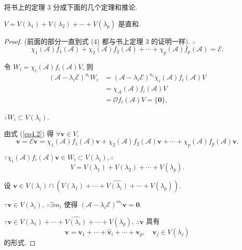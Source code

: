 \documentclass{ctexart}
\begin{document}
将书上的定理 3 分成下面的几个定理和推论.
\begin{theorem}\label{t4.2}
    $V=V(\lambda_1)+V(\lambda_2)+\cdots+V(\lambda_p)$ 是直和.
\end{theorem}
\begin{proof}
    (前面的部分一直到式 (4) 都与书上定理 3 的证明一样). $\therefore$
    \begin{equation}\label{eq4.2}
        \chi_1(\mathcal{A})f_1(\mathcal{A})+\chi_2(\mathcal{A})f_2(\mathcal{A})+\cdots+\chi_p(\mathcal{A})f_p(\mathcal{A})=\mathcal{E}.
    \end{equation}

    令 $W_i=\chi_i(\mathcal{A})f_i(\mathcal{A})V$, 则
    \begin{equation}\label{eq4.3}
        \begin{aligned}
            (\mathcal{A}-\lambda_i\mathcal{E})^{n_i}W_i & =(\mathcal{A}-\lambda_i\mathcal{E})^{n_i}\chi_i(\mathcal{A})f_i(\mathcal{A})V \\
            & =\chi_{\mathcal{A}}(\mathcal{A})f_i(\mathcal{A})V \\
            & =\mathcal{O}f_i(\mathcal{A})V=\{\boldsymbol{0}\},
        \end{aligned}
    \end{equation}

    $\therefore W_i\subset V(\lambda_i)$.

    由式 (\ref{eq4.2}) 得 $\forall\boldsymbol{v}\in V$,
    \begin{equation}\label{eq4.4}
        \boldsymbol{v}=\mathcal{E}\boldsymbol{v}=\chi_1(\mathcal{A})f_1(\mathcal{A})\boldsymbol{v}+\chi_2(\mathcal{A})f_2(\mathcal{A})\boldsymbol{v}+\cdots+\chi_p(\mathcal{A})f_p(\mathcal{A})\boldsymbol{v}.
    \end{equation}

    $\because\chi_i(\mathcal{A})f_i(\mathcal{A})\boldsymbol{v}\in W_i\subset V(\lambda_i),\therefore$
    \[V=V(\lambda_1)+V(\lambda_2)+\cdots+V(\lambda_p).\]

    设 $\boldsymbol{v}\in V(\lambda_i)\cap(V(\lambda_1)+\cdots+\widehat{V(\lambda_i)}+\cdots+V(\lambda_p))$.
    
    $\because\boldsymbol{v}\in V(\lambda_i)$, $\therefore\exists m_i$ 使得 $(\mathcal{A}-\lambda_i\mathcal{E})^{m_i}\boldsymbol{v}=\boldsymbol{0}$.

    $\because\boldsymbol{v}\in V(\lambda_1)+\cdots+\widehat{V(\lambda_i)}+\cdots+V(\lambda_p)$, $\therefore\boldsymbol{v}$ 具有
    \[\boldsymbol{v}=\boldsymbol{v}_1+\cdots+\hat{\boldsymbol{v}}_i+\cdots+\boldsymbol{v}_p,\quad\boldsymbol{v}_j\in V(\lambda_j)\]
    的形式.
    

\end{proof}
\end{document}
